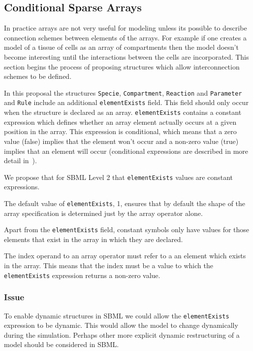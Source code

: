 \documentclass{cekarticle}
\begin{document}
\subsection{Conditional Sparse Arrays}

In practice arrays are not very useful for modeling unless its
possible to describe connection schemes between elements of the
arrays.  For example if one creates a model of a tissue of cells
as an array of compartments then the model doesn't become
interesting until the interactions between the cells are
incorporated.  This section begins the process of proposing
structures which allow interconnection schemes to be defined.

In this proposal the structures \texttt{Specie},
\texttt{Compartment}, \texttt{Reaction} and \texttt{Parameter} and
\texttt{Rule} include an additional \texttt{elementExists}
field.  This field should only occur when the structure is
declared as an array.  \texttt{elementExists} contains a constant
expression which defines whether an array element actually occurs
at a given position in the array.  This expression is
conditional, which means that a zero value (false) implies that
the element won't occur and a non-zero value (true) implies that
an element will occur (conditional expressions are described in
more detail in~\citet{finney:2002c}).

We propose that for SBML Level 2 that \texttt{elementExists}
values are constant expressions.

The default value of \texttt{elementExists}, 1, ensures that by
default the shape of the array specification is determined just
by the array operator alone.

Apart from the \texttt{elementExists} field, constant
symbols only have values for those elements that exist in the
array in which they are declared.

The index operand to an array operator must refer to a an element
which exists in the array.  This means that the index must be a
value to which the \texttt{elementExists} expression returns a
non-zero value.

\subsubsection{Issue}

To enable dynamic structures in SBML we could allow the
\texttt{elementExists} expression to be dynamic. This would allow
the model to change dynamically during the simulation.  Perhaps
other more explicit dynamic restructuring of a model should be
considered in SBML.
\end{document}
